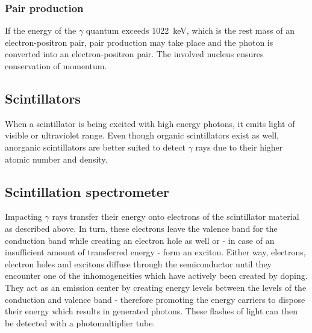 \subsubsection{Pair production}
If the energy of the $\gamma$ quantum exceeds \SI{1022}{\kilo\electronvolt}, which is the rest mass of an electron-positron pair, pair production may take place and the photon is converted into an electron-positron pair.
The involved nucleus ensures conservation of momentum.
\cite{AnleitungZusatz1}
%
\subsection{Scintillators}
When a scintillator is being excited with high energy photons, it emits light of visible or ultraviolet range.
Even though organic scintillators exist as well, anorganic scintillators are better suited to detect $\gamma$ rays due to their higher atomic number and density. \cite{Anleitung}
%
\subsection{Scintillation spectrometer}
Impacting $\gamma$ rays transfer their energy onto electrons of the scintillator material as described above.
In turn, these electrons leave the valence band for the conduction band while creating an electron hole as well or - in case of an insufficient amount of transferred energy - form an exciton.
Either way, electrons, electron holes and excitons diffuse through the semiconductor until they encounter one of the inhomogeneities which have actively been created by doping.
They act as an emission center by creating energy levels between the levels of the conduction and valence band - therefore promoting the energy carriers to dispose their energy which results in generated photons.
These flashes of light can then be detected with a photomultiplier tube.
